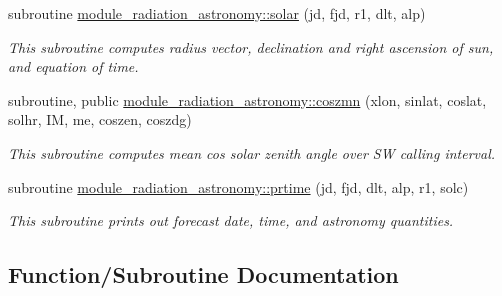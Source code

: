 \begin{DoxyCompactItemize}
\mbox{\label{group__module__radiation__astronomy_ga33f3a3fbb7f232aab2a624025c991890}} 
subroutine \hyperlink{group__module__radiation__astronomy_ga33f3a3fbb7f232aab2a624025c991890}{module\+\_\+radiation\+\_\+astronomy\+::solar} (jd, fjd, r1, dlt, alp)
\begin{DoxyCompactList}\small\item\em This subroutine computes radius vector, declination and right ascension of sun, and equation of time. \end{DoxyCompactList}\item 
subroutine, public \hyperlink{group__module__radiation__astronomy_ga804e1504ae720d0f33b507e7c42b6506}{module\+\_\+radiation\+\_\+astronomy\+::coszmn} (xlon, sinlat, coslat, solhr, IM, me, coszen, coszdg)
\begin{DoxyCompactList}\small\item\em This subroutine computes mean cos solar zenith angle over SW calling interval. \end{DoxyCompactList}\item 
\mbox{\label{group__module__radiation__astronomy_gaee29441c2e62c44728b10915a148cccf}} 
subroutine \hyperlink{group__module__radiation__astronomy_gaee29441c2e62c44728b10915a148cccf}{module\+\_\+radiation\+\_\+astronomy\+::prtime} (jd, fjd, dlt, alp, r1, solc)
\begin{DoxyCompactList}\small\item\em This subroutine prints out forecast date, time, and astronomy quantities. \end{DoxyCompactList}\end{DoxyCompactItemize}


\subsection{Function/\+Subroutine Documentation}
\mbox{\label{group__module__radiation__astronomy_ga804e1504ae720d0f33b507e7c42b6506}} 
